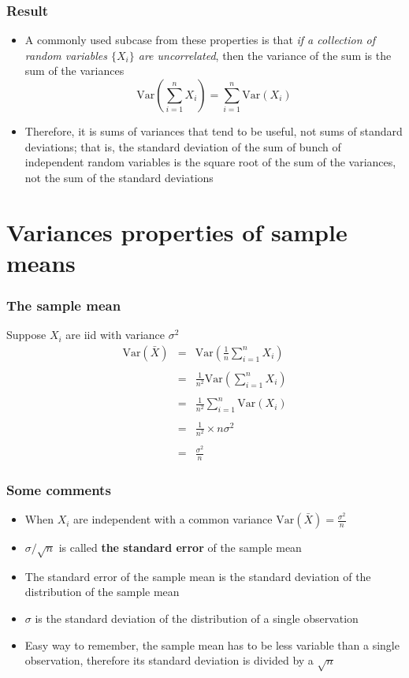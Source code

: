 \documentclass[aspectratio=169]{beamer}
\newcommand{\Var}{\mathrm{Var}}
\begin{document}
\begin{frame}
  \frametitle{Result}
  \begin{itemize}
  \item A commonly used subcase from these properties is that {\em if a collection of 
    random variables $\{X_i\}$ are uncorrelated}, then the variance of the sum is the
    sum of the variances
    $$
    \Var\left(\sum_{i=1}^n X_i \right) = \sum_{i=1}^n \Var(X_i)
    $$
  \item Therefore, it is sums of variances that tend to be useful, not
    sums of standard deviations; that is, the standard deviation of the
    sum of bunch of independent random variables is the square root of the
    sum of the variances, not the sum of the standard deviations
  \end{itemize}
\end{frame}

\section{Variances properties of sample means}
\begin{frame}\frametitle{The sample mean}
  Suppose $X_i$ are iid with variance $\sigma^2$
  \begin{eqnarray*}
    \Var(\bar X) & = & \Var \left( \frac{1}{n}\sum_{i=1}^n X_i \right)\\ \\
    & = & \frac{1}{n^2} \Var\left(\sum_{i=1}^n X_i \right)\\ \\
    & = & \frac{1}{n^2} \sum_{i=1}^n \Var(X_i) \\ \\
    & = & \frac{1}{n^2} \times n\sigma^2 \\ \\
    & = & \frac{\sigma^2}{n}
  \end{eqnarray*}
\end{frame}


\begin{frame}\frametitle{Some comments}
  \begin{itemize}
  \item When $X_i$ are independent with a common variance $\Var(\bar X) = \frac{\sigma^2}{n}$
  \item $\sigma/\sqrt{n}$ is called {\bf the standard error} of the sample mean
  \item The standard error of the sample mean is the standard deviation of the distribution of the sample mean
  \item $\sigma$ is the standard deviation of the distribution of a single observation
  \item Easy way to remember, the sample mean has to be less variable than a single observation, therefore its
    standard deviation is divided by a $\sqrt{n}$
  \end{itemize}
\end{frame}
\end{document}
